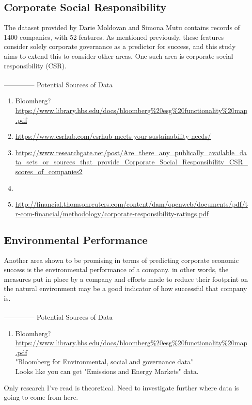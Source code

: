\subsection{Corporate Social Responsibility}
{The dataset provided by Darie Moldovan and Simona Mutu contains records of 1400 companies, with 52 features. As mentioned previously, these features consider solely corporate governance as a predictor for success, and this study aims to extend this to consider other areas. One such area is corporate social responsibility (CSR).\\\\
--------------
Potential Sources of Data
\begin{enumerate}
\item{Bloomberg? }\\
\url {https://www.library.hbs.edu/docs/bloomberg%20esg%20functionality%20map.pdf}
\item{\url{https://www.csrhub.com/csrhub-meets-your-sustainability-needs/}}
\item{\url{https://www.researchgate.net/post/Are_there_any_publically_available_data_sets_or_sources_that_provide_Corporate_Social_Responsibility_CSR_scores_of_companies2}}
\item{\cite{rahdari2015designing}}
\item{\url{http://financial.thomsonreuters.com/content/dam/openweb/documents/pdf/tr-com-financial/methodology/corporate-responsibility-ratings.pdf}}
\end{enumerate}}
\subsection{Environmental Performance}
{Another area shown to be promising in terms of predicting corporate economic success is the environmental performance of a company. in other words, the measures put in place by a company and efforts made to reduce their footprint on the natural environment may be a good indicator of how successful that company is. \\\\
--------------
Potential Sources of Data
\begin{enumerate}
\item{Bloomberg? }\\
\url {https://www.library.hbs.edu/docs/bloomberg%20esg%20functionality%20map.pdf}
\\
"Bloomberg for Environmental, social and governance data"\\
Looks like you can get "Emissions and Energy Markets" data.
\end{enumerate}
Only research I've read is theoretical. Need to investigate further where data is going to come from here.

}
